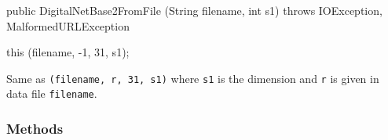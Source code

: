 \begin{htmlonly}
\end{htmlonly}
\begin{code}

   public DigitalNetBase2FromFile (String filename, int s1)
        throws IOException, MalformedURLException\begin{hide}
   {
       this (filename, -1, 31, s1);
   }\end{hide}
\end{code}
\begin{tabb}
   Same as \texttt{(filename, r, 31, s1)} where
   \texttt{s1} is the dimension and \texttt{r} is given in data file \texttt{filename}.
\end{tabb}
\begin{htmlonly}
\end{htmlonly}


\subsubsection*{Methods}

